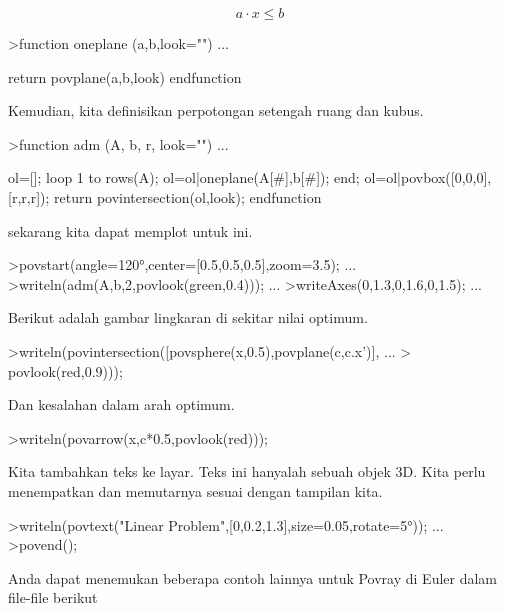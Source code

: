 \documentclass[a4paper,10pt]{article}
\begin{document}
\begin{eulernotebook}
\begin{eulercomment}
\begin{eulercomment}
\begin{eulercomment}
\end{eulercomment}
\begin{eulerformula}
\[
a \cdot x \le b
\]
\end{eulerformula}
\begin{eulerprompt}
>function oneplane (a,b,look="") ...
\end{eulerprompt}
\begin{eulerudf}
    return povplane(a,b,look)
  endfunction
\end{eulerudf}
\begin{eulercomment}
Kemudian, kita definisikan perpotongan setengah ruang dan kubus.
\end{eulercomment}
\begin{eulerprompt}
>function adm (A, b, r, look="") ...
\end{eulerprompt}
\begin{eulerudf}
    ol=[];
    loop 1 to rows(A); ol=ol|oneplane(A[#],b[#]); end;
    ol=ol|povbox([0,0,0],[r,r,r]);
    return povintersection(ol,look);
  endfunction
\end{eulerudf}
\begin{eulercomment}
sekarang kita dapat memplot untuk ini.
\end{eulercomment}
\begin{eulerprompt}
>povstart(angle=120°,center=[0.5,0.5,0.5],zoom=3.5); ...
>writeln(adm(A,b,2,povlook(green,0.4))); ...
>writeAxes(0,1.3,0,1.6,0,1.5); ...
\end{eulerprompt}
\begin{eulercomment}
Berikut adalah gambar lingkaran di sekitar nilai optimum.
\end{eulercomment}
\begin{eulerprompt}
>writeln(povintersection([povsphere(x,0.5),povplane(c,c.x')], ...
>  povlook(red,0.9)));
\end{eulerprompt}
\begin{eulercomment}
Dan kesalahan dalam arah optimum.
\end{eulercomment}
\begin{eulerprompt}
>writeln(povarrow(x,c*0.5,povlook(red)));
\end{eulerprompt}
\begin{eulercomment}
Kita tambahkan teks ke layar. Teks ini hanyalah sebuah objek 3D. Kita
perlu menempatkan dan memutarnya sesuai dengan tampilan kita.
\end{eulercomment}
\begin{eulerprompt}
>writeln(povtext("Linear Problem",[0,0.2,1.3],size=0.05,rotate=5°)); ...
>povend();
\end{eulerprompt}
\begin{eulercomment}
Anda dapat menemukan beberapa contoh lainnya untuk Povray di Euler
dalam file-file berikut


\end{eulercomment}
\end{eulercomment}
\end{eulercomment}
\end{eulernotebook}
\end{document}
